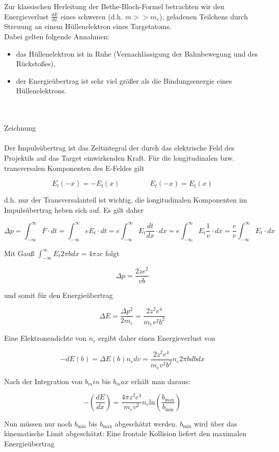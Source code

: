 Zur klassischen Herleitung der Bethe-Bloch-Formel betrachten wir den Energieverlust $\frac{dE}{dx}$
eines schweren (d.h. $m>>m_e$), geladenen Teilchens durch Streuung an einem Hüllenelektron eines
Targetatoms.
\\
Dabei gelten folgende Annahmen:
\begin{itemize}
  \item das Hüllenelektron ist in Ruhe (Vernachlässigung der Bahnbewegung und des Rückstoßes),
  \item der Energieübertrag ist sehr viel größer als die Bindungsenergie eines Hüllenelektrons.
\end{itemize}

\\
\\
Zeichnung
\\
\\
Der Impulsübertrag ist das Zeitintegral der durch das elektrische Feld des Projektils auf das
Target einwirkenden Kraft. Für die longitudinalen bzw. transversalen Komponenten des E-Feldes gilt

\[E_l(-x)=-E_l(x)~~~~~~~~~~~~~~~~~~~E_t(-x)=E_t(x)\]

d.h. nur der Transversalanteil ist wichtig, die longitudinalen Komponenten im Impulsübertrag heben
sich auf. Es gilt daher

\[\Delta p= \int_{-\infty}^{\infty}F\cdot dt = \int_{-\infty}^{\infty}eE_t\cdot dt =
e\int_{-\infty}^{\infty}E_t\frac{dt}{dx}\cdot dx
=e\int_{-\infty}^{\infty}E_t\frac{1}{v}\cdot dx
=\frac{e}{v}\int_{-\infty}^{\infty}E_t\cdot dx\]

Mit Gauß $\int_{-\infty}^{\infty}E_t2\pi bdx=4\pi ze$ folgt

\[\Delta p = \frac{2ze^2}{vb}\]

und somit für den Energieübertrag

\[\Delta E=\frac{\Delta p^2}{2m_e}=\frac{2z^2e^4}{m_ev^2b^2} \]

Eine Elektronendichte von $n_e$ ergibt daher einen Energieverlust von 

\[-dE(b)=\Delta E(b)n_edv=\frac{2z^2e^4}{m_ev^2b^2}n_e2\pi b db dx\]

Nach der Integration von $b_min$ bis $b_max$ erhält man daraus:

\[-\left(\frac{dE}{dx}\right)=\frac{4\pi z^2
e^4}{m_ev^2}n_e\text{ln}\left(\frac{b_{\text{max}}}{b_{\text{min}}}\right)\]

Nun müssen nur noch $b_{\text{min}}$ bis $b_{\text{max}}$ abgeschätzt werden. $b_{\text{min}}$ wird über das
kinematische Limit abgeschätzt: Eine frontale Kollision liefert den maximalen Energieübertrag

